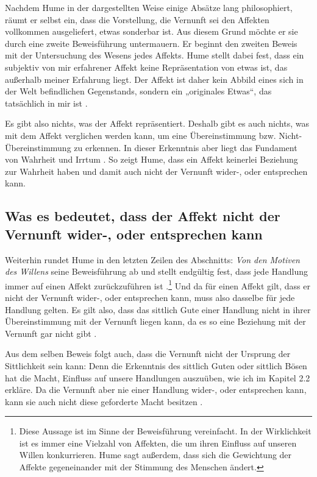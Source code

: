 \documentclass[ngerman,12pt]{diazessay} %
\begin{document}
\begin{doublespace}
Nachdem Hume in der dargestellten Weise einige Absätze lang philosophiert, räumt er selbst ein, dass die Vorstellung, die Vernunft sei den Affekten vollkommen ausgeliefert, etwas sonderbar ist. Aus diesem Grund möchte er sie durch eine zweite Beweisführung untermauern. Er beginnt den zweiten Beweis mit der Untersuchung des Wesens jedes Affekts. Hume stellt dabei fest, dass ein subjektiv von mir erfahrener Affekt keine Repräsentation von etwas ist, das außerhalb meiner Erfahrung liegt. Der Affekt ist daher kein Abbild eines sich in der Welt befindlichen Gegenstands, sondern ein „originales Etwas“, das tatsächlich in mir ist \cite[siehe S.486]{Hume.2013}.
\par\bigskip   
Es gibt also nichts, was der Affekt repräsentiert. Deshalb gibt es auch nichts, was mit dem Affekt verglichen werden kann, um eine Übereinstimmung bzw. Nicht-Übereinstimmung zu erkennen. In dieser Erkenntnis aber liegt das Fundament von Wahrheit und Irrtum \cite[siehe S.534]{Hume.2013}. So zeigt Hume, dass ein Affekt keinerlei Beziehung zur Wahrheit haben und damit auch nicht der Vernunft wider-, oder entsprechen kann.

\subsection{Was es bedeutet, dass der Affekt nicht der Vernunft wider-, oder entsprechen kann}

Weiterhin rundet Hume in den letzten Zeilen des Abschnitts: \textit{Von den Motiven des Willens} seine Beweisführung ab und stellt endgültig fest, dass jede Handlung immer auf einen Affekt zurückzuführen ist \cite[siehe S.489]{Hume.2013}.\footnote{Diese Aussage ist im Sinne der Beweisführung vereinfacht. In der Wirklichkeit ist es immer eine Vielzahl von Affekten, die um ihren Einfluss auf unseren Willen konkurrieren. Hume sagt außerdem, dass sich die Gewichtung der Affekte gegeneinander mit der Stimmung des Menschen ändert.} Und da für einen Affekt gilt, dass er nicht der Vernunft wider-, oder entsprechen kann, muss also dasselbe für jede Handlung gelten. Es gilt also, dass das sittlich Gute einer Handlung nicht in ihrer Übereinstimmung mit der Vernunft liegen kann, da es so eine Beziehung mit der Vernunft gar nicht gibt \cite[siehe S.534]{Hume.2013}.
\par\bigskip   
Aus dem selben Beweis folgt auch, dass die Vernunft nicht der Ursprung der Sittlichkeit sein kann: Denn die Erkenntnis des sittlich Guten oder sittlich Bösen hat die Macht, Einfluss auf unsere Handlungen auszuüben, wie ich im Kapitel 2.2 erkläre. Da die Vernunft aber nie einer Handlung wider-, oder entsprechen kann, kann sie auch nicht diese geforderte Macht besitzen \cite[siehe S.534]{Hume.2013}.


\end{doublespace}
\end{document}
